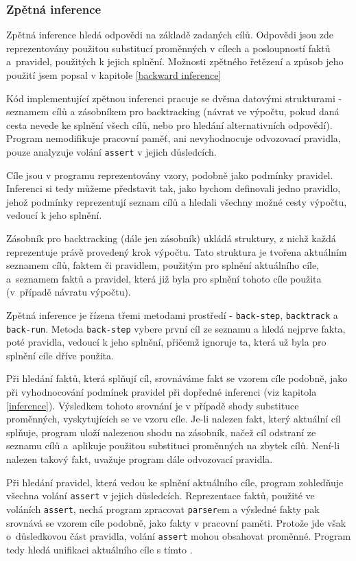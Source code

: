 \subsubsection{Zpětná inference}
\label{impl backward}

Zpětná inference hledá odpovědi na základě zadaných cílů. Odpovědi jsou zde
reprezentovány použitou substitucí proměnných v cílech a posloupností faktů
a~pravidel, použitých k jejich splnění. Možnosti zpětného řetězení a způsob jeho
použití jsem popsal v kapitole \ref{backward inference}

Kód implementující zpětnou inferenci pracuje se dvěma datovými strukturami -
seznamem cílů a zásobníkem pro backtracking (návrat ve výpočtu, pokud daná cesta
nevede ke splnění všech cílů, nebo pro hledání alternativních odpovědí). Program
nemodifikuje pracovní paměť, ani nevyhodnocuje odvozovací pravidla, pouze
analyzuje volání \verb|assert| v jejich důsledcích.

Cíle jsou v programu reprezentovány vzory, podobně jako podmínky pravidel.
Inferenci si tedy můžeme představit tak, jako bychom definovali jedno pravidlo,
jehož podmínky reprezentují seznam cílů a hledali všechny možné cesty výpočtu,
vedoucí k jeho splnění.

Zásobník pro backtracking (dále jen zásobník) ukládá struktury, z nichž každá
reprezentuje právě provedený krok výpočtu. Tato struktura je tvořena aktuálním
seznamem cílů, faktem či pravidlem, použitým pro splnění aktuálního cíle,
a~seznamem faktů a pravidel, která již byla pro splnění tohoto cíle použita
(v~případě návratu výpočtu).

Zpětná inference je řízena třemi metodami prostředí - \verb|back-step|,
\verb|backtrack| a \verb|back-run|. Metoda \verb|back-step| vybere první cíl ze
seznamu a hledá nejprve fakta, poté pravidla, vedoucí k jeho splnění, přičemž
ignoruje ta, která už byla pro splnění cíle dříve použita.

Při hledání faktů, která splňují cíl, srovnáváme fakt se vzorem cíle podobně,
jako při vyhodnocování podmínek pravidel při dopředné inferenci (viz kapitola
\ref{inference}). Výsledkem tohoto srovnání je v případě shody substituce
proměnných, vyskytujících se ve vzoru cíle. Je-li nalezen fakt, který aktuální
cíl splňuje, program uloží nalezenou shodu na zásobník, načež cíl odstraní ze
seznamu cílů a~aplikuje použitou substituci proměnných na zbytek cílů. Není-li
nalezen takový fakt, uvažuje program dále odvozovací pravidla.

Při hledání pravidel, která vedou ke splnění aktuálního cíle, program zohledňuje
všechna volání \verb|assert| v jejich důsledcích. Reprezentace faktů, použité ve
voláních \verb|assert|, nechá program zpracovat \verb|parser|em a výsledné fakty
pak srovnává se vzorem cíle podobně, jako fakty v pracovní paměti. Protože jde
však o~důsledkovou část pravidla, volání \verb|assert| mohou obsahovat proměnné.
Program tedy hledá unifikaci aktuálního cíle s tímto .

